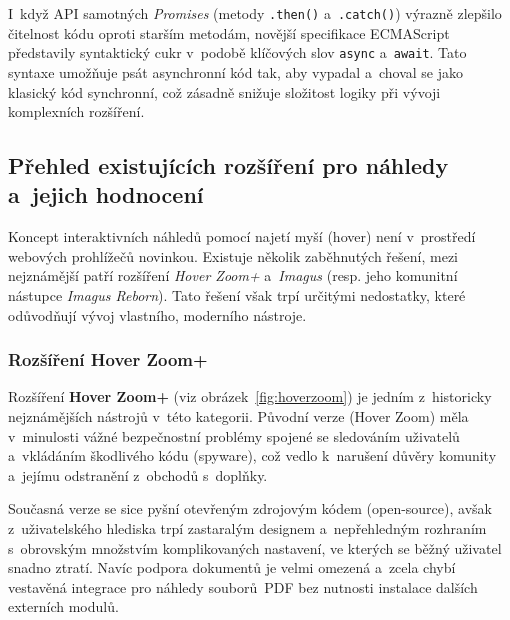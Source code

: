 \documentclass[a4paper,12pt]{article}
\begin{document}
I~když API samotných \textit{Promises} (metody \texttt{.then()} a~\texttt{.catch()}) výrazně zlepšilo čitelnost kódu oproti starším metodám, novější specifikace ECMAScript představily syntaktický cukr v~podobě klíčových slov \texttt{async} a~\texttt{await}. Tato syntaxe umožňuje psát asynchronní kód tak, aby vypadal a~choval se jako klasický kód synchronní, což zásadně snižuje složitost logiky při vývoji komplexních rozšíření.

\subsection{Přehled existujících rozšíření pro náhledy a~jejich hodnocení}
\label{subsec:teorie_existujici}

Koncept interaktivních náhledů pomocí najetí myší (hover) není v~prostředí webových prohlížečů novinkou. Existuje několik zaběhnutých řešení, mezi nejznámější patří rozšíření \textit{Hover Zoom+} a~\textit{Imagus} (resp. jeho komunitní nástupce \textit{Imagus Reborn}). Tato řešení však trpí určitými nedostatky, které odůvodňují vývoj vlastního, moderního nástroje.

\subsubsection*{Rozšíření Hover Zoom+}
Rozšíření \textbf{Hover Zoom+} (viz obrázek~\ref{fig:hoverzoom}) je jedním z~historicky nejznámějších nástrojů v~této kategorii. Původní verze (Hover Zoom) měla v~minulosti vážné bezpečnostní problémy spojené se sledováním uživatelů a~vkládáním škodlivého kódu (spyware), což vedlo k~narušení důvěry komunity a~jejímu odstranění z~obchodů s~doplňky.

Současná verze se sice pyšní otevřeným zdrojovým kódem (open-source), avšak z~uživatelského hlediska trpí zastaralým designem a~nepřehledným rozhraním s~obrovským množstvím komplikovaných nastavení, ve kterých se běžný uživatel snadno ztratí. Navíc podpora dokumentů je velmi omezená a~zcela chybí vestavěná integrace pro náhledy souborů~PDF bez nutnosti instalace dalších externích modulů.
\end{document}
